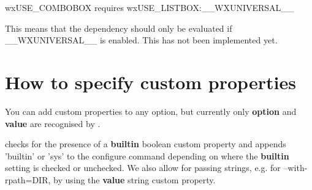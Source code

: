 wxUSE_COMBOBOX requires wxUSE_LISTBOX:__WXUNIVERSAL__

This means that the dependency should only be
evaluated if __WXUNIVERSAL__ is enabled.
This has not been implemented yet.

\section{How to specify custom properties}\label{customproperties}

You can add custom properties to any option, but
currently only {\bf option} and {\bf value} are
recognised by \ctshortname.

\ctshortname checks for the presence of a
{\bf builtin} boolean custom property and appends 'builtin' or
'sys' to the configure command depending on where
the {\bf builtin} setting is checked or unchecked.
We also allow for passing strings, e.g. for --with-rpath=DIR,
by using the {\bf value} string custom property.

\begin{comment}

\begin{helpglossary}

\gloss{thing}\label{thing}

A glossary entry.

\end{helpglossary}
\end{comment}



